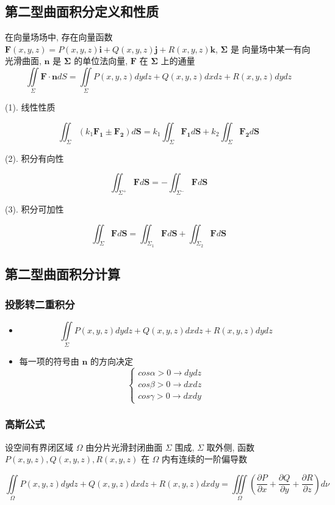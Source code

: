 \subsection{第二型曲面积分定义和性质}
\begin{definition}[第二型曲线积分]
	在向量场场中, 存在向量函数 $\boldsymbol{F}(x,y,z) = P(x,y,z)\boldsymbol{i} + Q(x,y,z)\boldsymbol{j} + R(x,y,z)\boldsymbol{k}$, $\boldsymbol{\Sigma}$ 是
	向量场中某一有向光滑曲面, $\boldsymbol{n}$ 是 $\boldsymbol{\Sigma}$ 的单位法向量, $\boldsymbol{F}$ 在 $\boldsymbol{\Sigma}$ 上的通量
	$$\iint\limits_{\Sigma}\boldsymbol{F}\cdot \boldsymbol{n}dS = \iint\limits_{\Sigma} P(x,y,z)dydz + Q(x,y,z)dxdz + R(x,y,z)dydz$$
\end{definition}
\begin{corollary}
	(1). 线性性质

	$$\iint_{\Sigma}(k_{1}\boldsymbol{F_{1}}\pm \boldsymbol{F_{2}})d\boldsymbol{S} = k_{1}\iint_{\Sigma}\boldsymbol{F_{1}}d\boldsymbol{S} + k_{2}\iint_{\Sigma}\boldsymbol{F_{2}}d\boldsymbol{S}$$
	
	(2). 积分有向性
	
	$$\iint_{\Sigma^{+}}\boldsymbol{F}d\boldsymbol{S} = - \iint_{\Sigma^{-}}\boldsymbol{F}d\boldsymbol{S}$$
	
	(3). 积分可加性
	
	$$\iint_{\Sigma}\boldsymbol{F}d\boldsymbol{S} = \iint_{\Sigma_{1}}\boldsymbol{F}d\boldsymbol{S} + \iint_{\Sigma_{2}}\boldsymbol{F}d\boldsymbol{S}$$
\end{corollary}
\subsection{第二型曲面积分计算}
\subsubsection{投影转二重积分}
\begin{itemize}
	\item  $$\iint\limits_{\Sigma} P(x,y,z)dydz + Q(x,y,z)dxdz + R(x,y,z)dydz $$
	\item  每一项的符号由 $\boldsymbol{n}$ 的方向决定
	$$\begin{cases}
	  cos\alpha > 0 \to dydz\\
	  cos\beta > 0 \to dxdz\\
	  cos\gamma > 0 \to dxdy
	\end{cases}$$
\end{itemize}
\subsubsection{高斯公式}
\begin{theorem}[高斯公式]
	
	设空间有界闭区域 $\Omega$ 由分片光滑封闭曲面 $\Sigma$ 围成, $\Sigma$ 取外侧, 函数 $P(x,y,z),Q(x,y,z),R(x,y,z)$ 在 $\Omega$ 内有连续的一阶偏导数
	
	$$\iint\limits_{\Omega}P(x,y,z)dydz+Q(x,y,z)dxdz+R(x,y,z)dxdy=\iiint\limits_{\Omega}\left(\frac{\partial P}{\partial x}+\frac{\partial Q}{\partial y}+\frac{\partial R}{\partial z}\right)d\nu$$
\end{theorem}